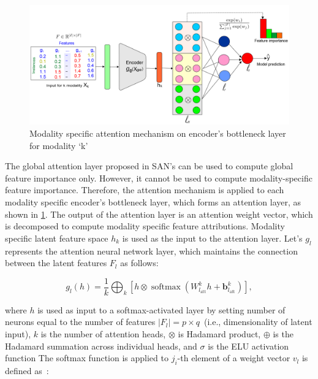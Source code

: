\begin{figure}
	\centering
	\includegraphics[scale=0.55]{images/k_attention.png}
	\caption{Modality specific attention mechanism on encoder's bottleneck layer for modality `k'}	
	\label{fig:k_attention}
\end{figure}

\hspace*{3.5mm} The global attention layer proposed in SAN's can be used to compute  global feature importance only. %
However, it cannot be used to compute modality-specific feature importance. Therefore, the attention mechanism is applied to each modality specific encoder's bottleneck layer, which forms an attention layer, as shown in \cref{fig:k_attention}. The output of the attention layer is an attention weight vector, which is decomposed to compute modality specific feature attributions.
Modality specific latent feature space $h_k$ is used as the input to the attention layer. Let's $g_l$ represents the attention neural network layer, which maintains the connection between the latent features $F_l$ as follows: 

\begin{equation}
    g_l(h)=\frac{1}{k} \bigoplus_{k}\left[h \otimes \operatorname{softmax}\left(W_{l_{\mathrm{att}}}^{k} h+\boldsymbol{b}_{l_{\mathrm{att}}}^{k}\right)\right],
\end{equation}

\hspace*{3.5mm} where $h$ is used as input to a softmax-activated layer by setting number of neurons equal to the number of features $|F_l|= p \times q $~(i.e., dimensionality of latent input), $k$ is the number of attention heads, $\otimes$ is Hadamard product, $\oplus$ is the Hadamard summation across individual heads, and $\sigma$ is the ELU activation function The softmax function is applied to $j_{i}$-th element of a weight vector $v_l$ is defined as~\cite{vskrlj2020feature}:

